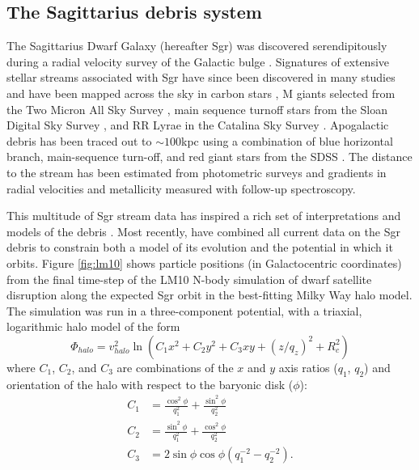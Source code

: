\documentclass{emulateapj}
\begin{document}
\subsection{The Sagittarius debris system}
\label{sec:sgr}
The Sagittarius Dwarf Galaxy (hereafter Sgr) was discovered
serendipitously during a radial velocity survey of the Galactic bulge
\citep{ibata94}. 
Signatures of extensive stellar
streams associated with Sgr have since been discovered in many studies and have been
mapped across the sky in carbon stars \citep{totten98}, M giants
selected from the Two Micron All Sky Survey \citep{majewski03}, main
sequence turnoff stars from the Sloan Digital Sky Survey
\citep{belokurov06}, and RR Lyrae in the Catalina Sky Survey
\citep{drake13}. Apogalactic debris has been traced out to $\sim 100$kpc 
using a combination of blue horizontal branch,
main-sequence turn-off, and red giant stars from the SDSS
\citep{belokurov13}.
The distance to the stream has been estimated from photometric surveys \citep[e.g.,][]{martinezdelgado04} and gradients in radial velocities and metallicity measured with follow-up spectroscopy\citep[e.g.,][]{majewski04, vivas05, bellazzini06, chou10, keller10}. 

This multitude of Sgr stream data has inspired a rich set of interpretations and models of the debris
\citep[e.g.,][]{johnston99b, fellhauer06}.
Most recently, \citet[][hereafter LM10]{law10} have combined all
current data on the Sgr debris to constrain both a model of its evolution
and the potential in which it orbits.
Figure \ref{fig:lm10} shows particle positions
(in Galactocentric coordinates) from the final time-step of the LM10 N-body
simulation of dwarf satellite disruption along the expected Sgr orbit
in the best-fitting Milky Way halo model. The simulation was
run in a three-component potential, with a triaxial, logarithmic halo
model of the form
\begin{equation}
  \Phi_{halo} = v_{halo}^2 \ln(C_1 x^2 + C_2 y^2 + C_3 xy + (z/q_z)^2 + R_c^2)
\end{equation}
where $C_1$, $C_2$, and $C_3$ are combinations of the $x$ and $y$ axis
ratios ($q_1$, $q_2$) and orientation of the halo with respect to the
baryonic disk ($\phi$):
\begin{align}
  C_1 &= \frac{\cos^2\phi}{q_1^2} + \frac{\sin^2\phi}{q_2^2}\\
  C_2 &= \frac{\sin^2\phi}{q_1^2} + \frac{\cos^2\phi}{q_2^2}\\
  C_3 &= 2\sin\phi\cos\phi \left(q_1^{-2} - q_2^{-2}\right).
\end{align}
\end{document}
